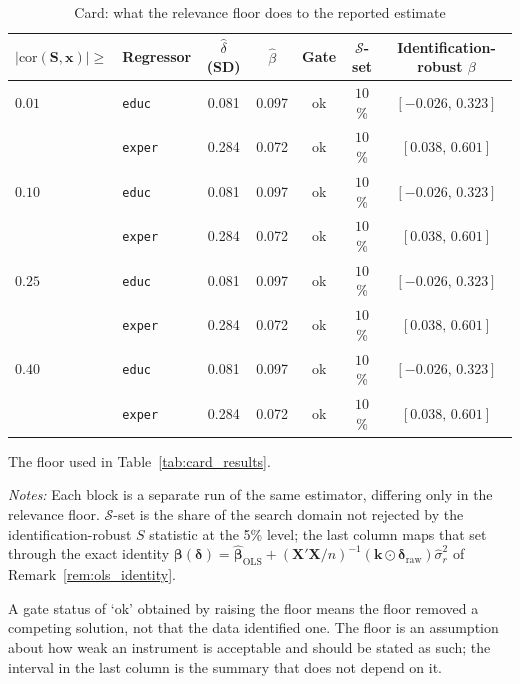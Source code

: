 \begin{table}[htbp]
\centering
\caption{Card: what the relevance floor does to the reported estimate}
\label{tab:card_sensitivity}
\begin{threeparttable}
\begin{tabular}{llccccc}
\toprule
$|\mathrm{cor}(\mathbf S,\mathbf x)|\ge$ & Regressor & $\widehat\delta$ (SD) & $\widehat\beta$ & Gate & $\mathcal S$-set & Identification-robust $\beta$ \\
\midrule
$0.01$\tnote{a} & \texttt{educ} & 0.081 & 0.097 & ok & $10$\% & $[-0.026,\,0.323]$ \\
 & \texttt{exper} & 0.284 & 0.072 & ok & $10$\% & $[0.038,\,0.601]$ \\
\addlinespace[2pt]
$0.10$ & \texttt{educ} & 0.081 & 0.097 & ok & $10$\% & $[-0.026,\,0.323]$ \\
 & \texttt{exper} & 0.284 & 0.072 & ok & $10$\% & $[0.038,\,0.601]$ \\
\addlinespace[2pt]
$0.25$ & \texttt{educ} & 0.081 & 0.097 & ok & $10$\% & $[-0.026,\,0.323]$ \\
 & \texttt{exper} & 0.284 & 0.072 & ok & $10$\% & $[0.038,\,0.601]$ \\
\addlinespace[2pt]
$0.40$ & \texttt{educ} & 0.081 & 0.097 & ok & $10$\% & $[-0.026,\,0.323]$ \\
 & \texttt{exper} & 0.284 & 0.072 & ok & $10$\% & $[0.038,\,0.601]$ \\
\bottomrule
\end{tabular}
\begin{tablenotes}
\small
\item[a] The floor used in Table~\ref{tab:card_results}.
\item \textit{Notes:} Each block is a separate run of the same estimator,
differing only in the relevance floor. $\mathcal S$-set is the share of
the search domain not rejected by the identification-robust $S$ statistic
at the 5\% level; the last column maps that set through the exact identity
$\boldsymbol\beta(\boldsymbol\delta)=
\widehat{\boldsymbol\beta}_{\mathrm{OLS}}
+(\mathbf X'\mathbf X/n)^{-1}(\mathbf k\odot\boldsymbol\delta_{\mathrm{raw}})
\widehat\sigma_r^2$ of Remark~\ref{rem:ols_identity}.
\item A gate status of `ok' obtained by raising the floor means the floor
removed a competing solution, not that the data identified one. The floor
is an assumption about how weak an instrument is acceptable and should be
stated as such; the interval in the last column is the summary that does
not depend on it.
\end{tablenotes}
\end{threeparttable}
\end{table}
